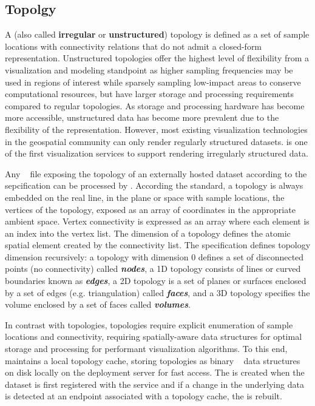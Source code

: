 \subsection{\ugrid{} Topolgy}
\label{sec:ugrid}
A \ugrid{} (also called {\bf irregular} or {\bf unstructured})
topology is defined as a set of sample locations with connectivity
relations that do not admit a closed-form representation. Unstructured
topologies offer the highest level of flexibility from a visualization
and modeling standpoint as higher sampling frequencies may be used in
regions of interest while sparsely sampling low-impact areas to
conserve computational resources, but have larger storage and
processing requirements compared to regular topologies. As storage and
processing hardware has become more accessible, unstructured data has
become more prevalent due to the flexibility of the
representation. However, most existing visualization technologies in
the geospatial community can only render regularly structured
datasets. \sciwms{} is one of the first visualization services to
support rendering irregularly structured data.

Any \ncml{}~\cite{ncml06} file exposing the topology of an externally
hosted dataset according to the \cfugrid{} sepcification can be
processed by \sciwms{}. According the \cfugrid{} standard, a topology
is always embedded on the real line, in the plane or space with sample
locations, the vertices of the topology, exposed as an array of
coordinates in the appropriate ambient space. Vertex connectivity is
expressed as an array where each element is an index into the vertex
list. The dimension of a topology defines the atomic spatial element
created by the connectivity list. The \cfugrid{} specification defines
topology dimension recursively: a topology with dimension 0 defines a
set of disconnected points (no connectivity) called
\textbf{\textit{nodes}}, a 1D topology consists of lines or curved
boundaries known as \textbf{\textit{edges}}, a 2D topology is a set of
planes or surfaces enclosed by a set of edges (e.g. triangulation)
called \textbf{\textit{faces}}, and a 3D topology specifies the volume
enclosed by a set of faces called \textbf{\textit{volumes}}.

In contrast with \cgrid{} topologies, \ugrid{} topologies require
explicit enumeration of sample locations and connectivity, requiring
spatially-aware data structures for optimal storage and processing for
performant visualization algorithms. To this end, \sciwms{} maintains
a local topology cache, storing \ugrid{} topologies as binary
\rtree{}~\cite{Guttman84} data structures on disk locally on the
deployment server for fast access. The \rtree{} is created when the
dataset is first registered with the \sciwms{} service and if a change
in the underlying data is detected at an endpoint associated with a
topology cache, the \rtree{} is rebuilt.
